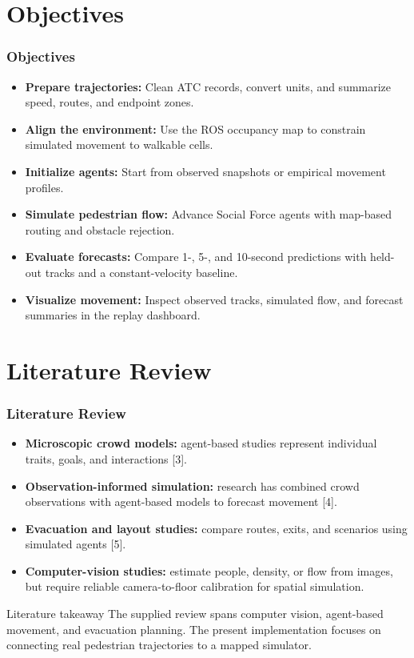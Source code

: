 \documentclass[aspectratio=43]{beamer}
\begin{document}
\section{Objectives}
\begin{frame}\frametitle{Objectives}
\large
\begin{itemize}
\setlength\itemsep{0.16cm}
\item \textbf{Prepare trajectories:} Clean ATC records, convert units, and summarize speed, routes, and endpoint zones.
\item \textbf{Align the environment:} Use the ROS occupancy map to constrain simulated movement to walkable cells.
\item \textbf{Initialize agents:} Start from observed snapshots or empirical movement profiles.
\item \textbf{Simulate pedestrian flow:} Advance Social Force agents with map-based routing and obstacle rejection.
\item \textbf{Evaluate forecasts:} Compare 1-, 5-, and 10-second predictions with held-out tracks and a constant-velocity baseline.
\item \textbf{Visualize movement:} Inspect observed tracks, simulated flow, and forecast summaries in the replay dashboard.
\end{itemize}
\end{frame}

\section{Literature Review}
\begin{frame}\frametitle{Literature Review}
\small
\begin{itemize}
\item \textbf{Microscopic crowd models:} agent-based studies represent individual traits, goals, and interactions [3].
\item \textbf{Observation-informed simulation:} research has combined crowd observations with agent-based models to forecast movement [4].
\item \textbf{Evacuation and layout studies:} compare routes, exits, and scenarios using simulated agents [5].
\item \textbf{Computer-vision studies:} estimate people, density, or flow from images, but require reliable camera-to-floor calibration for spatial simulation.
\end{itemize}
\vspace{0.16cm}
\begin{block}{Literature takeaway}
The supplied review spans computer vision, agent-based movement, and evacuation planning. The present implementation focuses on connecting real pedestrian trajectories to a mapped simulator.
\end{block}
\end{frame}
\end{document}
